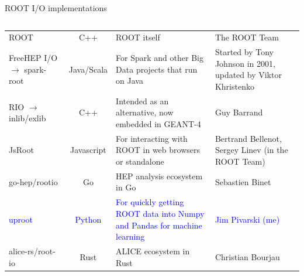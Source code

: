 \documentclass[aspectratio=169]{beamer}
\begin{document}
\begin{frame}{ROOT I/O implementations}
\vspace{0.25 cm}
\begin{columns}
\renewcommand{\arraystretch}{1.6}
\begin{tabular}{p{2.4 cm} c p{4.7 cm} p{5.25 cm}}
\centering ROOT & C++ & ROOT itself & The ROOT Team \\
\centering FreeHEP I/O $\to$ spark-root & Java/Scala & For Spark and other Big Data projects that run on Java & Started by Tony Johnson in 2001, updated by Viktor Khristenko \\
\centering RIO $\to$ inlib/exlib & C++ & Intended as an alternative, now embedded in GEANT-4 & Guy Barrand \\
\centering JsRoot & Javascript & For interacting with ROOT in web browsers or standalone & Bertrand Bellenot, Sergey Linev (in the ROOT Team) \\
\centering go-hep/rootio & Go & HEP analysis ecosystem in Go & Sebastien Binet \\
\centering \textcolor{blue}{uproot} & \textcolor{blue}{Python} & \textcolor{blue}{For quickly getting ROOT data into Numpy and Pandas for machine learning} & \textcolor{blue}{Jim Pivarski (me)} \\
alice-rs/root-io & Rust & ALICE ecosystem in Rust & Christian Bourjau \\
\end{tabular}
\end{columns}
\end{frame}
\end{document}
